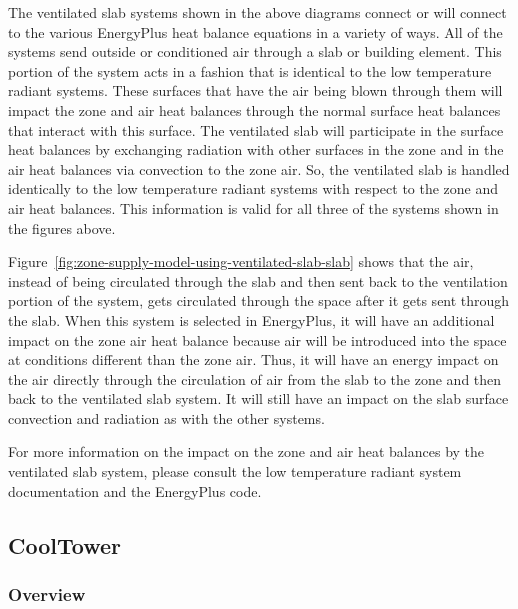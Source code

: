 The ventilated slab systems shown in the above diagrams connect or will connect to the various EnergyPlus heat balance equations in a variety of ways. All of the systems send outside or conditioned air through a slab or building element. This portion of the system acts in a fashion that is identical to the low temperature radiant systems. These surfaces that have the air being blown through them will impact the zone and air heat balances through the normal surface heat balances that interact with this surface. The ventilated slab will participate in the surface heat balances by exchanging radiation with other surfaces in the zone and in the air heat balances via convection to the zone air. So, the ventilated slab is handled identically to the low temperature radiant systems with respect to the zone and air heat balances. This information is valid for all three of the systems shown in the figures above.

Figure~\ref{fig:zone-supply-model-using-ventilated-slab-slab} shows that the air, instead of being circulated through the slab and then sent back to the ventilation portion of the system, gets circulated through the space after it gets sent through the slab. When this system is selected in EnergyPlus, it will have an additional impact on the zone air heat balance because air will be introduced into the space at conditions different than the zone air. Thus, it will have an energy impact on the air directly through the circulation of air from the slab to the zone and then back to the ventilated slab system. It will still have an impact on the slab surface convection and radiation as with the other systems.

For more information on the impact on the zone and air heat balances by the ventilated slab system, please consult the low temperature radiant system documentation and the EnergyPlus code.

\subsection{CoolTower}\label{cooltower}

\subsubsection{Overview}\label{overview-11}

